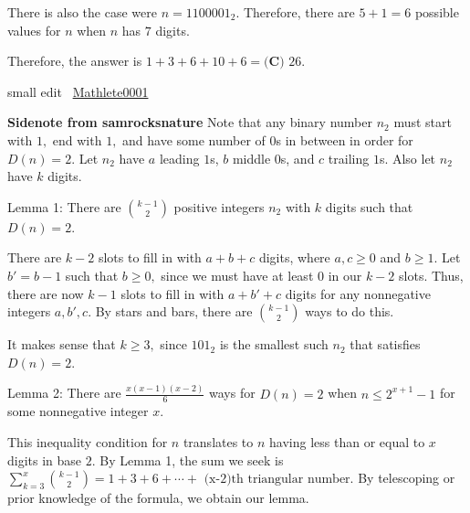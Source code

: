 \begin{enumerate}
 There is also the case were $n = 1100001_2$. Therefore, there are $5+1=6$ possible values for $n$ when $n$ has $7$ digits.

 Therefore, the answer is $1+3+6+10+6=\boxed{\textbf{(C) } 26}$.

 small edit ~\href{https://artofproblemsolving.com/wiki/index.php/User:Mathlete0001}{Mathlete0001}

 \textbf{Sidenote from samrocksnature} Note that any binary number $n_2$ must start with $1,$ end with $1,$ and have some number of $0$s in between in order for $D(n)=2.$ Let $n_2$ have $a$ leading $1$s, $b$ middle $0$s, and $c$ trailing $1$s. Also let $n_2$ have $k$ digits. 

 Lemma 1: There are $\binom{k-1}{2}$ positive integers $n_2$ with $k$ digits such that $D(n)=2.$ 

 There are $k-2$ slots to fill in with $a+b+c$ digits, where $a,c\geq 0$ and $b \geq 1.$ Let $b'=b-1$ such that $b \geq 0,$ since we must have at least $0$ in our $k-2$ slots. Thus, there are now $k-1$ slots to fill in with $a+b'+c$ digits for any nonnegative integers $a,b',c.$ By stars and bars, there are $\binom{k-1}{2}$ ways to do this. 

 It makes sense that $k \geq 3,$ since $101_2$ is the smallest such $n_2$ that satisfies $D(n)=2.$

 Lemma 2: There are $\frac{x(x-1)(x-2)}{6}$ ways for $D(n)=2$ when $n \leq 2^{x+1}-1$ for some nonnegative integer $x.$

 This inequality condition for $n$ translates to $n$ having less than or equal to $x$ digits in base $2.$ By Lemma 1, the sum we seek is $\sum_{k=3}^{x}\binom{k-1}{2}=1+3+6+ \cdots + \text{ (x-2)th triangular number}.$ By telescoping or prior knowledge of the formula, we obtain our lemma.

 


\end{enumerate}